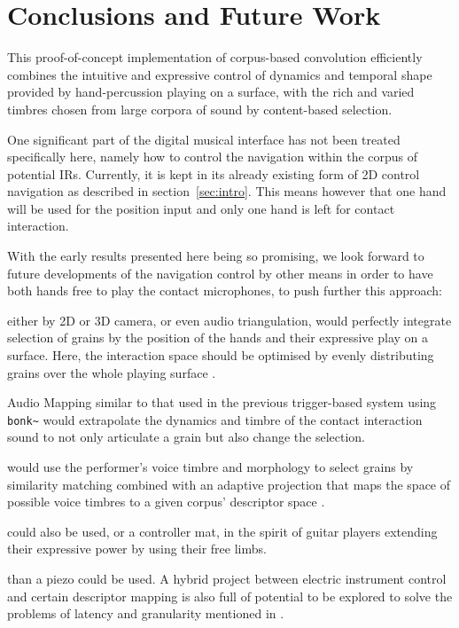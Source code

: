 \section{Conclusions and Future Work}\label{sec:future}

This proof-of-concept implementation of corpus-based convolution efficiently combines the intuitive and expressive control of dynamics and temporal shape provided by hand-percussion playing on a surface, with the rich and varied timbres chosen from large corpora of sound by content-based selection.


One significant part of the digital musical interface has not been treated specifically here, namely how to control the navigation within the corpus of potential IRs. Currently, it is kept in its already existing form of 2D control navigation as described in section~\ref{sec:intro}.
%
This means however that one hand will be used for the position input and only one hand is left for contact interaction.

With the early results presented here being so promising, we look forward to future developments of the navigation control by other means in order to have both hands free to play the contact microphones, to push further this approach:

\begin{description}
\item[Hand Position Tracking] either by 2D or 3D camera, or even audio triangulation, would perfectly integrate selection of grains by the position of the hands and their expressive play on a surface.  Here, the interaction space should be optimised by evenly distributing grains over the whole playing surface \cite{LallemandSchwarz-dafx2011-distribute}.
\begin{sloppypar}
\item[Audio Mapping] similar to that used in the previous trigger-based system using \verb|bonk~| would extrapolate the dynamics and timbre of the contact interaction sound to not only articulate a grain but also change the selection.
\end{sloppypar}
\item[Voice Control] would use the performer's voice timbre and morphology to select grains by similarity matching combined with an adaptive projection that maps the space of possible voice timbres to a given corpus' descriptor space \cite{StowellPlumbley-smc2010-timbre-remapping-regression-tree,Fasciani-si2013b}.
\item[Pedals] could also be used, or a controller mat, in the spirit of guitar players extending their expressive power by using their free limbs.
\item[Other Sources] than a piezo could be used. A hybrid project between electric instrument control and certain descriptor mapping is also full of potential to be explored to solve the problems of latency and granularity mentioned in \cite{TremblaySchwarz-nime2010-surfing-the-waves}.
\end{description}

